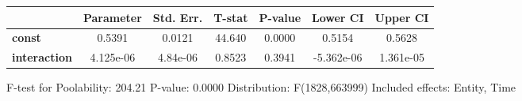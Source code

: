 \begin{center}
\begin{tabular}{lclc}
\end{tabular}
\begin{tabular}{lcccccc}
                     & \textbf{Parameter} & \textbf{Std. Err.} & \textbf{T-stat} & \textbf{P-value} & \textbf{Lower CI} & \textbf{Upper CI}  \\
\midrule
\textbf{const}       &       0.5391       &       0.0121       &      44.640     &      0.0000      &       0.5154      &       0.5628       \\
\textbf{interaction} &     4.125e-06      &      4.84e-06      &      0.8523     &      0.3941      &     -5.362e-06    &     1.361e-05      \\
\bottomrule
\end{tabular}
\end{center}

F-test for Poolability: 204.21 \newline
 P-value: 0.0000 \newline
 Distribution: F(1828,663999) \newline
  \newline
 Included effects: Entity, Time